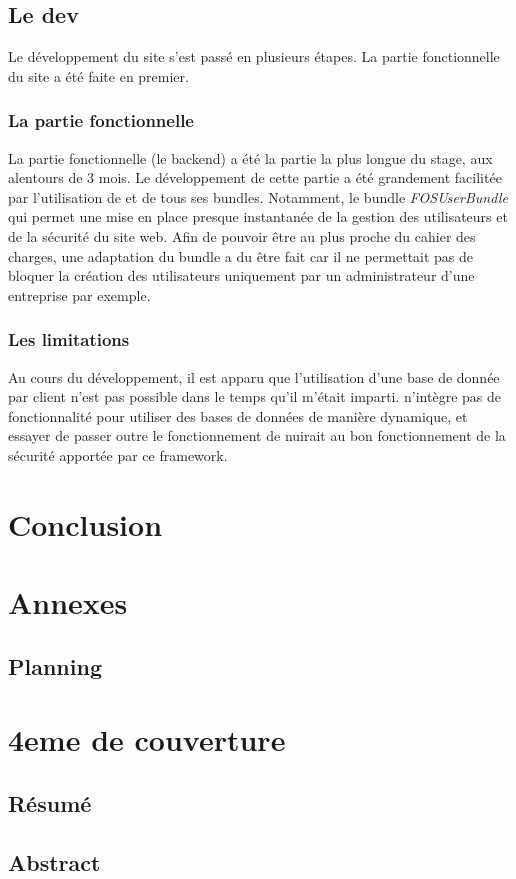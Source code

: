 \documentclass[a4paper, 11pt]{report}
\begin{document}
\chapter{Le dev}
Le développement du site \agenda s'est passé en plusieurs étapes. La partie fonctionnelle du site a été faite en premier.
    \section{La partie fonctionnelle}
    La partie fonctionnelle (le backend) a été la partie la plus longue du stage, aux alentours de 3 mois. Le développement de cette partie a été grandement facilitée par l'utilisation de \symfony et de tous ses bundles. Notamment, le bundle \textit{FOSUserBundle} qui permet une mise en place presque instantanée de la gestion des utilisateurs et de la sécurité du site web. Afin de pouvoir être au plus proche du cahier des charges, une adaptation du bundle a du être fait car il ne permettait pas de bloquer la création des utilisateurs uniquement par un administrateur d'une entreprise par exemple.

    \section{Les limitations}
    Au cours du développement, il est apparu que l'utilisation d'une base de donnée par client n'est pas possible dans le temps qu'il m'était imparti. \symfony n'intègre pas de fonctionnalité pour utiliser des bases de données de manière dynamique, et essayer de passer outre le fonctionnement de \symfony nuirait au bon fonctionnement de la sécurité apportée par ce framework.
\part{Conclusion}

\part{Annexes}
\begin{appendix}
    \chapter{Planning}
\end{appendix}

\part{4eme de couverture}
\chapter{Résumé}
\chapter{Abstract}
\end{document}
